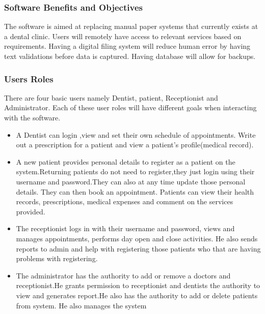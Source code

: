 \documentclass[11 pt]{article}
\begin{document}
\subsubsection{Software Benefits and Objectives}
The software is aimed at replacing manual paper systems that currently exists at a dental clinic.
Users will remotely have access to relevant services based on requirements.
Having a digital filing system will reduce human error by having text validations before data is captured. Having database will allow for backups.
\subsubsection{Users Roles}
There are four basic users namely Dentist, patient, Receptionist and Administrator. Each of these user roles will have different goals when interacting with the software.
\begin{itemize}
\item
A Dentist can login ,view and set their own schedule of appointments. Write out a prescription for a patient and view a patient's profile(medical record).
\item
A new patient provides personal details to register as a patient on the system.Returning patients do not need to register,they just login using their username and password.They can also at any time update those personal details. They can then book an appointment. Patients can view their health  records, prescriptions, medical expenses and comment on the services provided.
\item
The receptionist logs in with their username and password, views and manages  appointments, performs day open and close activities. He also sends reports to admin and help with registering those patients who that are having problems with registering.
\item
The administrator has the authority to add or remove a doctors and receptionist.He grants permission to receptionist  and  dentists the authority to view and generates report.He also has the authority to add or delete patients from system. He also manages the system
\end{itemize}
\end{document}
